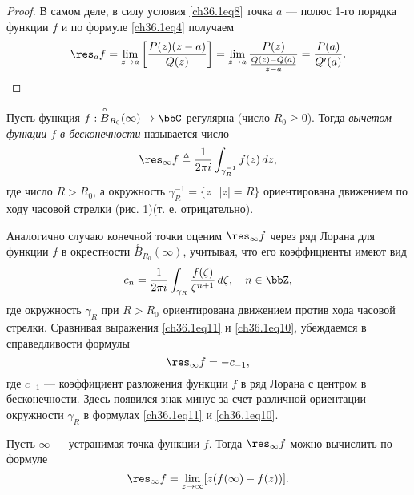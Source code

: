 \begin{proof}
В самом деле, в силу условия \eqref{ch36.1eq8} точка $a$ --- полюс 1-го порядка функции $f$ и по формуле  \eqref{ch36.1eq4} получаем
$$
\res_{a} f = \lim_{z \to a} \left[ \frac{P(z)(z - a)}{Q(z)}\right] = \lim_{z \to a} \frac{P(z)}{\frac{Q(z) - Q(a)}{z - a}} = \frac{P(a)}{Q'(a)}.
$$
\end{proof}

\begin{defn} \label{ch36defn2}
Пусть функция $f : \overset{\circ}{B}_{R_0}(\infty) \to \bbC$ регулярна (число $R_0 \ge 0$). Тогда \textit{вычетом функции $f$ в бесконечности} называется число
\begin{equation} \label{ch36.1eq10}
\res_{\infty} f \triangleq \frac{1}{2\pi i} \int_{\gamma_R^{-1}} f(z) \,dz,
\end{equation}
где число $R > R_0$, а окружность $\gamma_R^{-1} = \{ z \: \big| \: |z| = R \}$ ориентирована движением по ходу часовой стрелки (рис. 1)(т. е. отрицательно).
\end{defn}

Аналогично случаю конечной точки оценим $\res_{\infty} f$ через ряд Лорана для функции $f$ в окрестности $\overset{\circ}{B}_{R_0}(\infty)$, учитывая, что его коэффициенты имеют вид
\begin{equation} \label{ch36.1eq11}
c_n = \frac{1}{2\pi i} \int_{\gamma_R} \frac{f(\zeta)}{\zeta^{n + 1}} \,d\zeta, \quad n \in \bbZ,
\end{equation}
где окружность $\gamma_R$ при $R > R_0$ ориентирована движением против хода часовой стрелки. Сравнивая выражения \eqref{ch36.1eq11} и \eqref{ch36.1eq10}, убеждаемся в справедливости формулы
\begin{equation} \label{ch36.1eq12}
\res_{\infty} f = -c_{-1},
\end{equation}
где $c_{-1}$ --- коэффициент разложения функции $f$ в ряд Лорана с центром в бесконечности. Здесь появился знак минус за счет различной ориентации окружности $\gamma_R$ в формулах \eqref{ch36.1eq11} и \eqref{ch36.1eq10}.

\begin{lemm} \label{ch36.1lemm3}
Пусть $\infty$ --- устранимая точка функции $f$. Тогда $\res_{\infty} f$ можно вычислить по формуле
\begin{equation} \label{ch36.1eq13}
\res_{\infty} f = \lim_{z \to \infty} [z(f(\infty) - f(z))].
\end{equation}

\end{lemm}

